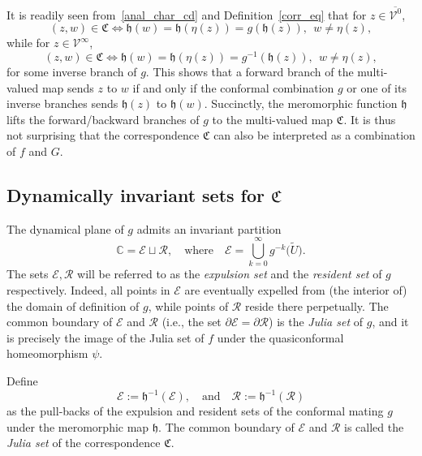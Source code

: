 \documentclass[11pt,a4paper, oneside]{amsart}
\theoremstyle{definition}
\theoremstyle{remark}
\numberwithin{equation}{section}
\def\cV{\mathcal {V}}
\def\cE{\mathcal {E}}
\def\cR{\mathcal {R}}
\newcommand{\C}{\mathbb{C}}
\renewcommand{\tilde}{\widetilde}
\begin{document}
It is readily seen from~\eqref{anal_char_cd} and Definition~\ref{corr_eq} that for $z\in \overline{\cV^0}$,
\begin{equation}
 (z, w) \in \mathfrak{C} \iff \mathfrak{h}(w) = \mathfrak{h}(\eta(z)) = g(\mathfrak{h}(z)),\ \ w\neq \eta(z), 
 \label{in_V_0_equation}
\end{equation}
while for $z \in \cV^\infty$,
\begin{equation}
    (z,w)\in \mathfrak{C} \iff \mathfrak{h}(w) = \mathfrak{h}(\eta(z)) = g^{-1}(\mathfrak{h}(z)),\ \ w\neq \eta(z),
    \label{outside_V_0_equation}
\end{equation}
for some inverse branch of $g$. This shows that a forward branch of the multi-valued map sends $z$ to $w$ if and only if 
the conformal combination $g$ or one of its inverse branches sends $\mathfrak{h}(z)$ to $\mathfrak{h}(w)$. Succinctly, the meromorphic function $\mathfrak{h}$ lifts the forward/backward branches of $g$ to the multi-valued map $\mathfrak{C}$. It is thus not surprising that the correspondence $\mathfrak{C}$ can also be interpreted as a combination of $f$ and $G$.


\subsection{Dynamically invariant sets for $\mathfrak{C}$}\label{inv_partition_corr_subsec}
The dynamical plane of $g$ admits an invariant partition
$$
\C=\mathcal{E}\sqcup \cR,\quad \mathrm{where}\quad \mathcal{E}=\bigcup_{k=0}^\infty g^{-k}\big(\tilde U\big).
$$
The sets $\cE,\cR$ will be referred to as the \emph{expulsion set} and the \emph{resident set} of $g$ respectively. Indeed, all points in $\cE$ are eventually expelled from (the interior of) the domain of definition of $g$, while points of $\cR$ reside there perpetually. The common boundary of $\cE$ and $\cR$ (i.e., the set $\partial\mathcal{E}=\partial\cR$) is the \emph{Julia set} of $g$, and it is precisely the image of the Julia set of $f$ under the quasiconformal homeomorphism $\psi$.  

Define
$$
\pmb{\cE}:= \mathfrak{h}^{-1}(\cE),\quad \text{and} \quad \pmb{\cR} := \mathfrak{h}^{-1}(\cR)
$$
as the pull-backs of the expulsion and resident sets of the conformal mating $g$ under the meromorphic map $\mathfrak{h}$. The common boundary of $\pmb{\cE}$ and $\pmb{\cR}$ is called the \emph{Julia set} of the correspondence $\mathfrak{C}$.
\end{document}
